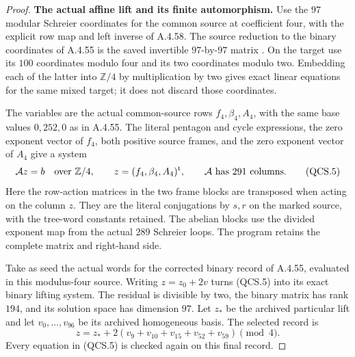 \begin{proof}
\par\medskip\noindent\textbf{The actual affine lift and its finite automorphism.}
Use the $97$ modular Schreier coordinates for the common source at
coefficient four, with the explicit row map and left inverse of A.4.58.
The source reduction to the binary coordinates of A.4.55 is the saved
invertible $97$-by-$97$ matrix
.  On the target use its $100$ coordinates
modulo four and its two coordinates modulo two.  Embedding each of the
latter into $\mathbb Z/4$ by multiplication by two gives exact linear
equations for the same mixed target; it does not discard those
coordinates.

The variables are the actual common-source rows $f_4,\beta_4,A_4$,
with the same base values $0,252,0$ as in A.4.55.  The literal pentagon
and cycle expressions, the zero exponent vector of $f_4$, both positive
source frames, and the zero exponent vector of $A_4$ give a system
\[
             \mathcal A z=b\quad\text{over }\mathbb Z/4,
             \qquad z=(f_4,\beta_4,A_4)^{\rm t},
             \qquad \mathcal A\text{ has }291\text{ columns}.
 \tag{QCS.5}
\]
Here the row-action matrices in the two frame blocks are transposed
when acting on the column $z$.  They are the literal conjugations by
$s,r$ on the marked source, with the tree-word constants retained.
The abelian blocks use the divided exponent map from the actual
$289$ Schreier loops.  The program
 retains the complete matrix and right-hand
side.

Take as seed the actual words for the corrected binary record of
A.4.55, evaluated in this modulus-four source.  Writing
$z=z_0+2v$ turns (QCS.5) into its exact binary lifting system.
The residual is divisible by two, the binary matrix has rank $194$,
and its solution space has dimension $97$.  Let $z_*$ be the archived
particular lift and let $v_0,\ldots,v_{96}$ be its archived homogeneous
basis.  The selected record is
\[
 z=z_*+2(v_9+v_{10}+v_{15}+v_{52}+v_{59})\pmod4.
 \tag{QCS.6}
\]
Every equation in (QCS.5) is checked again on this final record.


\end{proof}
